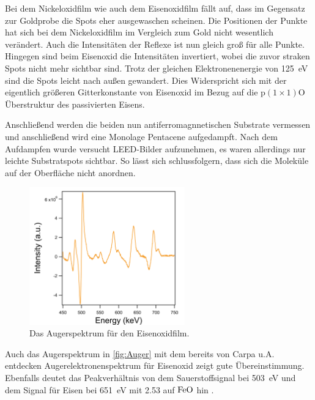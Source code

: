             Bei dem Nickeloxidfilm wie auch dem Eisenoxidfilm fällt auf, dass im Gegensatz zur Goldprobe die Spots eher ausgewaschen scheinen.
            Die Positionen der Punkte hat sich bei dem Nickeloxidfilm im Vergleich zum Gold nicht wesentlich verändert.
            Auch die Intensitäten der Reflexe ist nun gleich groß für alle Punkte.
            Hingegen sind beim Eisenoxid die Intensitäten invertiert, wobei die zuvor straken Spots nicht mehr sichtbar sind.
            Trotz der gleichen Elektronenenergie von \SI{125}{\electronvolt} sind die Spots leicht nach außen gewandert.
            Dies Widerspricht sich mit der eigentlich größeren Gitterkonstante von Eisenoxid im Bezug auf die p$(1 \times 1)$O Überstruktur des passivierten Eisens.

            Anschließend werden die beiden nun antiferromagnnetischen Substrate vermessen und anschließend wird eine Monolage Pentacene aufgedampft.
            Nach dem Aufdampfen wurde versucht LEED-Bilder aufzunehmen, es waren allerdings nur leichte Substratspots sichtbar.
            So lässt sich schlussfolgern, dass sich die Moleküle auf der Oberfläche nicht anordnen.

            \begin{figure}
                \centering
                \includegraphics[width=0.6\textwidth]{./content/pictures/FeO/2021_09_09_001_AES_FeO.png}
                \caption{Das Augerspektrum für den Eisenoxidfilm.}
                \label{fig:Auger}
            \end{figure}
            Auch das Augerspektrum in \autoref{fig:Auger} mit dem bereits von Carpa u.A. \cite{FeO_1} entdecken Augerelektronenspektrum für Eisenoxid zeigt gute Übereinstimmung.
            Ebenfalls deutet das Peakverhältnis von dem Sauerstoffsignal bei \SI{503}{\electronvolt} und dem Signal für Eisen bei \SI{651}{\electronvolt} mit \num{2.53} auf $\ce{FeO}$ hin \cite{FeO_1, Auger}.
        

